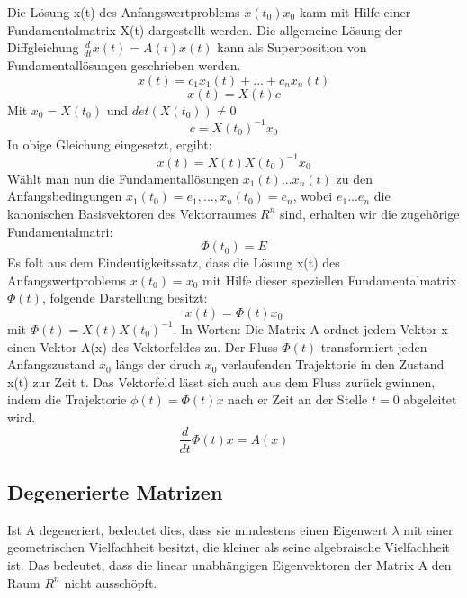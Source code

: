 Die Lösung x(t) des Anfangswertproblems $x(t_0) x_0$ kann mit Hilfe einer Fundamentalmatrix X(t) dargestellt werden. Die allgemeine Lösung der Diffgleichung $\frac{d}{dt}x(t) = A(t)x(t)$ kann als Superposition von Fundamentallösungen  geschrieben werden.\\
\begin{equation*}
x(t) = c_1 x_1(t) + ... + c_n x_n(t)
\end{equation*}
\begin{equation*}
x(t) = X(t)c
\end{equation*}
Mit $x_0 = X(t_0)$ und $det(X(t_0)) \neq 0$
\begin{equation*}
c = X(t_0)^{-1}x_0
\end{equation*}
In obige Gleichung eingesetzt, ergibt: 
\begin{equation*}
x(t) = X(t)X(t_0)^{-1}x_0
\end{equation*}
Wählt man nun die Fundamentallösungen $x_1(t) ... x_n(t)$ zu den Anfangsbedingungen $x_1(t_0)=e_1, ..., x_n(t_0)=e_n$, wobei $e_1...e_n$ die kanonischen Basisvektoren des Vektorraumes $R^n$ sind, erhalten wir die zugehörige Fundamentalmatri:
\begin{equation*}
\Phi(t_0) = E
\end{equation*}
Es folt aus dem Eindeutigkeitssatz, dass die Lösung x(t) des Anfangswertproblems $x(t_0) = x_0$ mit Hilfe dieser speziellen Fundamentalmatrix $\Phi(t)$, folgende Darstellung besitzt: 
\begin{equation*}
x(t) = \Phi(t)x_0
\end{equation*}
mit $\Phi(t) = X(t)X(t_0)^{-1}$. In Worten: Die Matrix A ordnet jedem Vektor x einen Vektor A(x) des Vektorfeldes zu. Der Fluss $\Phi(t)$ transformiert jeden Anfangszustand $x_0$ längs der druch $x_0$ verlaufenden Trajektorie in den Zustand x(t) zur Zeit t. 
Das Vektorfeld lässt sich auch aus dem Fluss zurück gwinnen, indem die Trajektorie $\phi(t) = \Phi(t)x$ nach er Zeit an der Stelle $t=0$ abgeleitet wird. 
\begin{equation*}
\frac{d}{dt}\Phi(t)x = A(x)
\end{equation*}
\subsection{Degenerierte Matrizen}
Ist A degeneriert, bedeutet dies, dass sie mindestens einen Eigenwert $\lambda$ mit einer geometrischen Vielfachheit besitzt, die kleiner als seine algebraische Vielfachheit ist. 
Das bedeutet, dass die linear unabhängigen Eigenvektoren der Matrix A den Raum $R^n$ nicht ausschöpft. 

